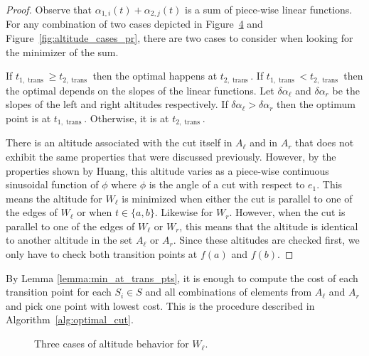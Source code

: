 \documentclass[../main.tex]{subfiles}
\begin{document}
\begin{proof}
Observe that $\alpha_{1,i}(t)+\alpha_{2,j}(t)$ is a sum of piece-wise linear functions.  For any combination of two cases depicted in Figure~\ref{fig:altitude_cases_pl} and Figure~\ref{fig:altitude_cases_pr}, there are two cases to consider when looking for the minimizer of the sum.

If $t_{1,\operatorname{trans}}\geq t_{2,\operatorname{trans}}$ then the optimal happens at $t_{2,\operatorname{trans}}$. If $t_{1,\operatorname{trans}}<t_{2,\operatorname{trans}}$ then the optimal depends on the slopes of the linear functions. Let $\delta\alpha_{\ell}$ and $\delta\alpha_r$ be the slopes of the left and right altitudes respectively. If $\delta\alpha_{\ell}>\delta\alpha_r$ then the optimum point is at $t_{1,\operatorname{trans}}$. Otherwise, it is at $t_{2,\operatorname{trans}}$.

There is an altitude associated with the cut itself in $A_{\ell}$ and in $A_r$ that does not exhibit the same properties that were discussed previously. However, by the properties shown by Huang\cite{Huang2001optimal}, this altitude varies as a piece-wise continuous sinusoidal function of $\phi$ where $\phi$ is the angle of a cut with respect to $e_1$. This means the altitude for $W_{\ell}$ is minimized when either the cut is parallel to one of the edges of $W_{\ell}$ or when $t\in\{a,b\}$. Likewise for $W_r$. However, when the cut is parallel to one of the edges of $W_{\ell}$ or $W_r$, this means that the altitude is identical to another altitude in the set $A_{\ell}$ or $A_r$. Since these altitudes are checked first, we only have to check both transition points at $f(a)$ and $f(b)$.
\end{proof}

By Lemma \ref{lemma:min_at_trans_pts}, it is enough to compute the cost of each transition point for each $S_i\in S$ and all combinations of elements from $A_{\ell}$ and $A_r$ and pick one point with lowest cost. This is the procedure described in Algorithm~\ref{alg:optimal_cut}.

\begin{figure}
	\centering
	\begin{subfigure}{0.45\linewidth}
		\centering
		
		\caption{\label{fig:altitude_case_i}}
	\end{subfigure}%
	\quad
	\begin{subfigure}{0.45\linewidth}
		\centering
		
		\caption{\label{fig:altitude_case_ii}}
	\end{subfigure}
	\begin{subfigure}{0.45\linewidth}
		\centering
		
		\caption{\label{fig:altitude_case_iii}}
	\end{subfigure}
	\caption{Three cases of altitude behavior for $W_{\ell}$.}
	\label{fig:altitude_cases_pl}
\end{figure}
\end{document}
